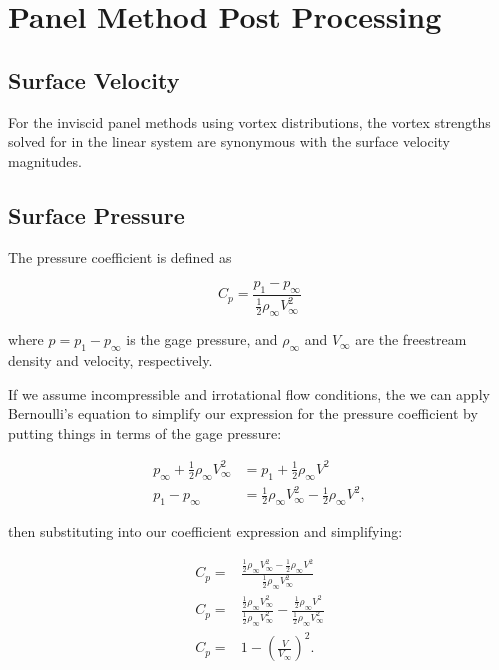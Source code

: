 \section{Panel Method Post Processing}
\label{sec:panelmethodpostprocessing}

\subsection{Surface Velocity}

For the inviscid panel methods using vortex distributions, the vortex strengths solved for in the linear system are synonymous with the surface velocity magnitudes.

\subsection{Surface Pressure}

The pressure coefficient is defined as

\begin{equation}
	C_p = \frac{p_1 - p_\infty}{\frac{1}{2} \rho_\infty V_\infty^2}
\end{equation}

\noindent where \(p = p_1-p_\infty\) is the gage pressure, and \(\rho_\infty\) and \(V_\infty\) are the freestream density and velocity, respectively.

If we assume incompressible and irrotational flow conditions, the we can apply Bernoulli's equation to simplify our expression for the pressure coefficient by putting things in terms of the gage pressure:

\begin{equation}
\begin{aligned}
	p_\infty + \frac{1}{2} \rho_\infty V_\infty^2 &= p_1 + \frac{1}{2} \rho_\infty V^2 \\
	p_1 - p_\infty  &= \frac{1}{2} \rho_\infty V_\infty^2 - \frac{1}{2} \rho_\infty V^2,
\end{aligned}
\end{equation}

\noindent then substituting into our coefficient expression and simplifying:

\begin{equation}
\begin{aligned}
	C_p =& \frac{\frac{1}{2} \rho_\infty V_\infty^2 - \frac{1}{2} \rho_\infty V^2}{\frac{1}{2} \rho_\infty V_\infty^2} \\
	C_p =& \frac{\frac{1}{2} \rho_\infty V_\infty^2}{\frac{1}{2} \rho_\infty V_\infty^2} - \frac{\frac{1}{2} \rho_\infty V^2}{\frac{1}{2} \rho_\infty V_\infty^2} \\
	C_p =& 1 - \left(\frac{V}{V_\infty}\right)^2.
\end{aligned}
\end{equation}

